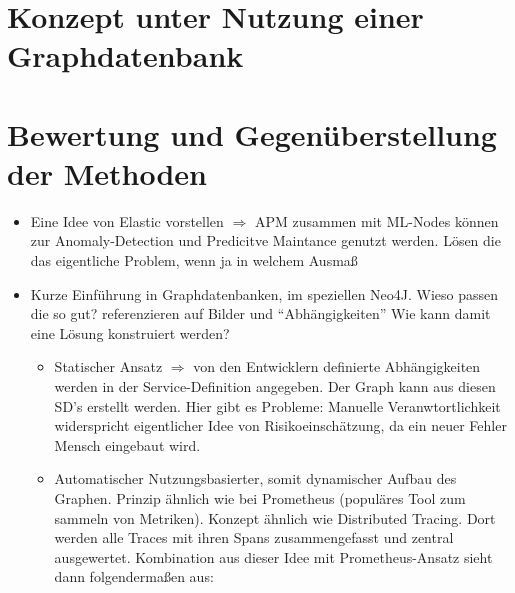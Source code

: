 \documentclass[
	12pt,
	BCOR=5mm,
	DIV=12,
	headinclude=on,
	footinclude=off,
	parskip=half,
	bibliography=totoc,
	listof=entryprefix,
	toc=listof,
	numbers=noenddot,
	plainfootsepline
]{scrreprt}
\begin{document}
\section{Konzept unter Nutzung einer Graphdatenbank}

\section{Bewertung und Gegenüberstellung der Methoden}

\begin{itemize}
	\item Eine Idee von Elastic vorstellen $\Rightarrow$ APM zusammen mit ML-Nodes können zur Anomaly-Detection und Predicitve Maintance genutzt werden. Lösen die das eigentliche Problem, wenn ja in welchem Ausmaß
	\item Kurze Einführung in Graphdatenbanken, im speziellen Neo4J. Wieso passen die so gut? referenzieren auf Bilder und \enquote{Abhängigkeiten} Wie kann damit eine Lösung konstruiert werden?
	\begin{itemize}
		\item Statischer Ansatz $\Rightarrow$ von den Entwicklern definierte Abhängigkeiten werden in der Service-Definition angegeben. Der Graph kann aus diesen SD's erstellt werden. Hier gibt es Probleme: Manuelle Veranwtortlichkeit widerspricht eigentlicher Idee von Risikoeinschätzung, da ein neuer Fehler Mensch eingebaut wird.
		\item Automatischer Nutzungsbasierter, somit dynamischer Aufbau des Graphen. Prinzip ähnlich wie bei Prometheus (populäres Tool zum sammeln von Metriken). Konzept ähnlich wie Distributed Tracing. Dort werden alle Traces mit ihren Spans zusammengefasst und zentral ausgewertet. Kombination aus dieser Idee mit Prometheus-Ansatz sieht dann folgendermaßen aus:
		

\end{itemize}
\end{itemize}
\end{document}
